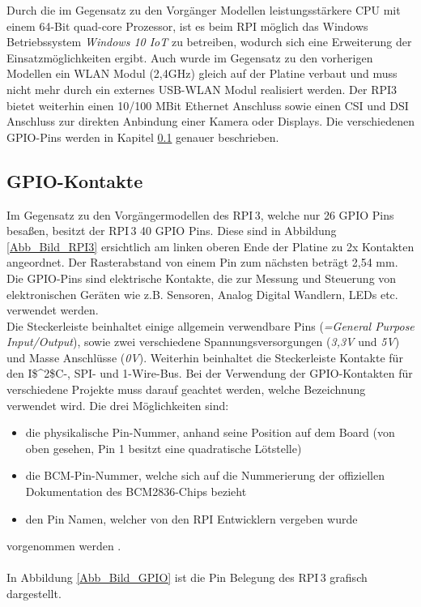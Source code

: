 Durch die im Gegensatz zu den Vorgänger Modellen leistungsstärkere CPU mit einem 64-Bit quad-core Prozessor, ist es beim RPI möglich das Windows Betriebssystem \textit{Windows 10 IoT} zu betreiben, wodurch sich eine Erweiterung der Einsatzmöglichkeiten ergibt. Auch wurde im Gegensatz zu den vorherigen Modellen  ein WLAN Modul (2,4\;GHz) gleich auf der Platine verbaut und muss nicht mehr durch ein externes USB-WLAN Modul realisiert werden. Der \ac{RPI}3 bietet weiterhin einen 10/100 MBit Ethernet Anschluss sowie einen \ac{CSI} und \ac{DSI} Anschluss zur direkten Anbindung einer Kamera oder Displays. Die verschiedenen GPIO-Pins werden in Kapitel \ref{subsection_GPIO} genauer beschrieben.

\subsection{GPIO-Kontakte}
\label{subsection_GPIO}
Im Gegensatz zu den Vorgängermodellen des \ac{RPI}\,3, welche nur 26 GPIO Pins besaßen, besitzt der \ac{RPI}\,3 40 GPIO Pins. Diese sind in Abbildung \ref{Abb_Bild_RPI3} ersichtlich am linken oberen Ende der Platine zu 2\;x Kontakten angeordnet. Der Rasterabstand von einem Pin zum nächsten beträgt 2,54 mm. Die GPIO-Pins sind elektrische Kontakte, die zur Messung und Steuerung von elektronischen Geräten wie z.B. Sensoren, Analog Digital Wandlern, LEDs etc. verwendet werden.\\
Die Steckerleiste beinhaltet einige allgemein verwendbare Pins (\textit{=\;General Purpose Input\;/\;Output}), sowie zwei verschiedene Spannungsversorgungen (\textit{3,3\;V} und \textit{5\;V}) und Masse Anschlüsse (\textit{0\;V}). Weiterhin beinhaltet die Steckerleiste Kontakte für den \ac{I$^2$C}-, \ac{SPI}- und 1-Wire-Bus. Bei der Verwendung der GPIO-Kontakten für verschiedene Projekte muss darauf geachtet werden, welche Bezeichnung verwendet wird. Die drei Möglichkeiten sind:
\begin{itemize}
\item die physikalische Pin-Nummer, anhand seine Position auf dem Board (von oben gesehen, Pin 1 besitzt eine quadratische Lötstelle)
\item die BCM-Pin-Nummer, welche sich auf die Nummerierung der offiziellen Dokumentation des BCM2836-Chips bezieht
\item den Pin Namen, welcher von den \ac{RPI} Entwicklern vergeben wurde 
\end{itemize} 
vorgenommen werden \citep{Raspberri_Pi_Handbuch}.\\\\
In Abbildung \ref{Abb_Bild_GPIO} ist die Pin Belegung des \ac{RPI}\,3 grafisch dargestellt.

